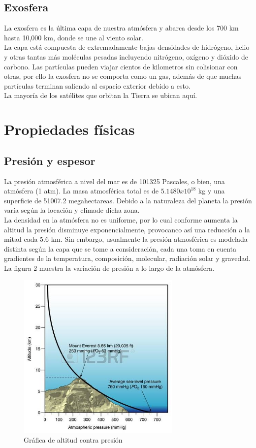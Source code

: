 \subsection{Exosfera}
La exosfera es la última capa de nuestra atmósfera y abarca desde los
700 km hasta 10,000 km, donde se une al viento solar.
\\[3mm] La capa está compuesta de extremadamente bajas densidades de hidrógeno, helio y otras tantas más moléculas pesadas incluyendo
nitrógeno, oxígeno y dióxido de carbono. Las partículas pueden viajar cientos de kilometros sin colisionar con otras, por ello la exosfera
no se comporta como un gas, además de que muchas partículas terminan saliendo al espacio exterior debido a esto.
\\[3mm] La mayoría de los satélites que orbitan la Tierra se ubican
aquí.

\section{Propiedades físicas}
\subsection{Presión y espesor}
La presión atmosférica a nivel del mar es de 101325 Pascales, o bien,
una atmósfera (1 atm). La masa atmosférica total es de $5.1480x10^{18}$
kg y una superficie de 51007.2 megahectareas. Debido a la naturaleza
del planeta la presión  varía según la locación y climade dicha zona.
\\[3mm] La densidad en la atmósfera no es uniforme, por lo cual conforme
aumenta la altitud la presión disminuye exponencialmente, provocanco así
una reducción a la mitad cada 5.6 km. Sin embargo, usualmente la presión
atmosférica es modelada distinta según la capa que se tome a consideración,
cada una toma en cuenta gradientes de la temperatura, composición, molecular, radiación solar y gravedad.
\\[3mm] La figura 2 muestra la variación de presión a lo largo de la
atmósfera.

\begin{figure}
\centering
\includegraphics[width=8cm]{Presion}
\caption{\label{presion} Gráfica de altitud contra presión}
\end{figure}

